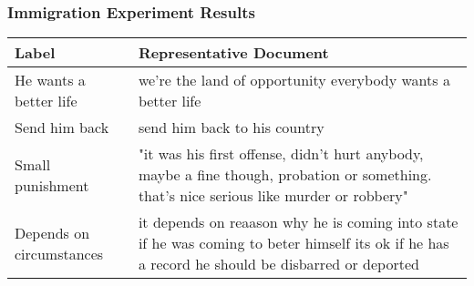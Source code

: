 \documentclass[xcolor=dvipsnames]{beamer}
\begin{document}
\begin{frame}
\frametitle{Immigration Experiment Results}

\begin{table}[ht!]
\centering
\scriptsize
\begin{tabular}{|p{1.5in}|p{2.75in}|}
  \hline
Label & Representative Document \\
  \hline
He wants a better life & we're the land of opportunity everybody wants a better life                                                                                                                                                                                                                                                                                                                                                                                                                                                                                                                                                                                               \\
Send him back & send him back to his country                                                                                                                                                                                                                                                                                                                                                                                                                                                                                                                                                                                                                              \\
Small punishment & "it was his first offense, didn't hurt anybody, maybe a fine though, probation or something. that's nice serious like murder or robbery"                                                                                                                                                                                                                                                                                                                                                                                                                                                                                                                  \\
Depends on circumstances & it depends on reaason why he is coming into state if he was coming to beter himself its ok if he has a record he should be disbarred or deported                                                                                                                                                                                                                                                                                                                                                                                                                                                                                                          \\

\end{tabular}
\end{table}
\end{frame}
\end{document}
